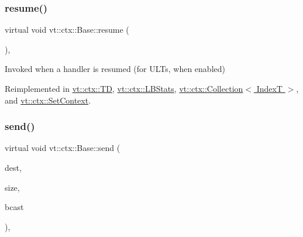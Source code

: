 \mbox{\label{structvt_1_1ctx_1_1_base_a303afabb40ed83057fbe30c744db95da}} 
\subsubsection{\texorpdfstring{resume()}{resume()}}
{\footnotesize\ttfamily virtual void vt\+::ctx\+::\+Base\+::resume (\begin{DoxyParamCaption}{ }\end{DoxyParamCaption})\hspace{0.3cm}{\ttfamily [inline]}, {\ttfamily [virtual]}}



Invoked when a handler is resumed (for U\+L\+Ts, when enabled) 



Reimplemented in \hyperlink{structvt_1_1ctx_1_1_t_d_aa21b5afe01312244e338eefecde83bc6}{vt\+::ctx\+::\+TD}, \hyperlink{structvt_1_1ctx_1_1_l_b_stats_a099850f1bd53aafe650ed9e3958ca54b}{vt\+::ctx\+::\+L\+B\+Stats}, \hyperlink{structvt_1_1ctx_1_1_collection_a4cf87cf7d38bd8d4706ffda41e31c9c6}{vt\+::ctx\+::\+Collection$<$ Index\+T $>$}, and \hyperlink{structvt_1_1ctx_1_1_set_context_a5d0e979f3d601900223d0db9bb8992d3}{vt\+::ctx\+::\+Set\+Context}.

\mbox{\label{structvt_1_1ctx_1_1_base_ad704f380544dc7e874e23f5700c52db0}} 
\subsubsection{\texorpdfstring{send()}{send()}}
{\footnotesize\ttfamily virtual void vt\+::ctx\+::\+Base\+::send (\begin{DoxyParamCaption}\item[{\hyperlink{namespacevt_a866da9d0efc19c0a1ce79e9e492f47e2}{Node\+Type}}]{dest,  }\item[{\hyperlink{namespacevt_a408e86a8c7c89309b52907dc5a513924}{Msg\+Size\+Type}}]{size,  }\item[{bool}]{bcast }\end{DoxyParamCaption})\hspace{0.3cm}{\ttfamily [inline]}, {\ttfamily [virtual]}}



